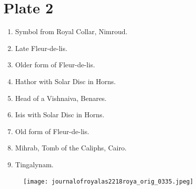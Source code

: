 \documentclass[a4paper, 11pt, oneside, english, landscape, twocolumn]{article}
\begin{document}
\section*{Plate 2}
\begin{enumerate}
    \item Symbol from Royal Collar, Nimroud.

    \item Late Fleur-de-lis.

    \item Older form of Fleur-de-lis.

    \item Hathor with Solar Disc in Horns.

    \item Head of a Vishnaiva, Benares.

    \item Isis with Solar Disc in Horns.

    \item Old form of Fleur-de-lis.

    \item Mihrab, Tomb of the Caliphs, Cairo.

    \item Tingalynam.
\end{enumerate}
\vspace*{\fill}  
\clearpage
\vspace*{\fill}  
\begin{figure}[H]
\centering
\texttt{[image: journalofroyalas2218roya\_orig\_0335.jpeg]}
\end{figure}
\vspace*{\fill} 
\clearpage
\vspace*{\fill}  
\end{document}
